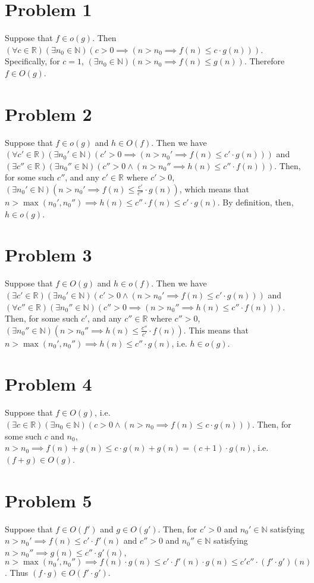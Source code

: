 \documentclass[12pt]{article}
\begin{document}
	\section{Problem 1}
		Suppose that $f \in o(g)$. Then $(\forall c \in \mathbb{R})(\exists n_0 \in \mathbb{N})(c > 0 \implies (n > n_0 \implies f(n) \le c \cdot g(n)))$. Specifically, for $c = 1$, $(\exists n_0 \in \mathbb{N})(n > n_0 \implies f(n) \le g(n))$. Therefore $f \in O(g)$.
	\section{Problem 2}
		Suppose that $f \in o(g)$ and $h \in O(f)$. Then we have $(\forall c' \in \mathbb{R})(\exists n_0' \in \mathbb{N})(c' > 0 \implies (n > n_0' \implies f(n) \le c' \cdot g(n)))$ and $(\exists c'' \in \mathbb{R})(\exists n_0'' \in \mathbb{N})(c'' > 0 \wedge (n > n_0'' \implies h(n) \le c'' \cdot f(n)))$. Then, for some such $c''$, and any $c' \in \mathbb{R}$ where $c' > 0$, $(\exists n_0' \in \mathbb{N})(n > n_0' \implies f(n) \le \frac{c'}{c''} \cdot g(n))$, which means that $n > \max(n_0', n_0'') \implies h(n) \le c'' \cdot f(n) \le c' \cdot g(n)$. By definition, then, $h \in o(g)$.
	\section{Problem 3}
		Suppose that $f \in O(g)$ and $h \in o(f)$. Then we have $(\exists c' \in \mathbb{R})(\exists n_0' \in \mathbb{N})(c' > 0 \wedge (n > n_0' \implies f(n) \le c' \cdot g(n)))$ and $(\forall c'' \in \mathbb{R})(\exists n_0'' \in \mathbb{N})(c'' > 0 \implies (n > n_0'' \implies h(n) \le c'' \cdot f(n)))$. Then, for some such $c'$, and any $c'' \in \mathbb{R}$ where $c'' > 0$, $(\exists n_0'' \in \mathbb{N})(n > n_0'' \implies h(n) \le \frac{c''}{c'} \cdot f(n))$. This means that $n > \max(n_0', n_0'') \implies h(n) \le c'' \cdot g(n)$, i.e. $h \in o(g)$.
	\section{Problem 4}
		Suppose that $f \in O(g)$, i.e. $(\exists c \in \mathbb{R})(\exists n_0 \in \mathbb{N})(c > 0 \wedge (n > n_0 \implies f(n) \le c \cdot g(n)))$. Then, for some such $c$ and $n_0$, $n > n_0 \implies f(n) + g(n) \le c \cdot g(n) + g(n) = (c + 1) \cdot g(n)$, i.e. $(f + g) \in O(g)$.
	\section{Problem 5}
		Suppose that $f \in O(f')$ and $g \in O(g')$. Then, for $c' > 0$ and $n_0' \in \mathbb{N}$ satisfying $n > n_0' \implies f(n) \le c' \cdot f'(n)$ and $c'' > 0$ and $n_0'' \in \mathbb{N}$ satisfying $n > n_0'' \implies g(n) \le c'' \cdot g'(n)$, $n > \max(n_0', n_0'') \implies f(n) \cdot g(n) \le c' \cdot f'(n) \cdot g(n) \le c'c'' \cdot (f' \cdot g')(n)$. Thus $(f \cdot g) \in O(f' \cdot g')$.
\end{document}
